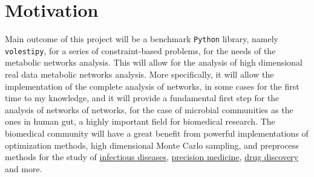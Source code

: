 \documentclass[a4paper, 12pt]{article}
\def\volesti{{\tt volesti}}
\begin{document}



\section{Motivation}\label{sec:motivation}
Main outcome of this project will be a benchmark \texttt{Python} library, namely \texttt{volestipy}, for a series of constraint-based problems, for the needs of the metabolic networks analysis. This will allow for 
the analysis of high dimensional real data metabolic networks analysis. More specifically, it will allow the implementation of the complete analysis of networks, in some cases for the first time to my knowledge, and it will provide a fundamental first step for the analysis of networks of networks, for the case of microbial communities as the ones in human gut, a highly important field for biomedical research.
The biomedical community will have a great benefit from powerful implementations of optimization methods, high dimensional Monte Carlo sampling, and preprocess methods for the study of \textcolor{blue}{\href{https://www.frontiersin.org/articles/10.3389/fcimb.2020.00052/full}{infectious diseases}}, \textcolor{blue}{\href{https://www.sciencedirect.com/science/article/pii/S155041311730092X}{precision medicine}}, \textcolor{blue}{\href{https://www.sciencedirect.com/science/article/pii/S1359644613002481}{drug discovery}} and more. 
\end{document}
